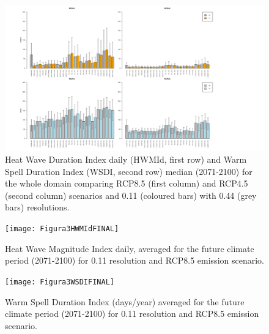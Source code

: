 \newpage
\begin{figure}
\graphicspath{ {articulo} }
\includegraphics[width=17.0cm]{Figura1conSD_conjunto}
\caption{Heat Wave Duration Index daily (HWMId, first row) and Warm Spell Duration Index (WSDI, second row) median (2071-2100) for the whole domain comparing RCP8.5 (first column) and RCP4.5 (second column) scenarios and 0.11 (coloured bars) with 0.44 (grey bars) resolutions.}
\label{fig1}       %
\end{figure}

\newpage
\begin{figure}
\texttt{[image: Figura3HWMIdFINAL]}
\caption{Heat Wave Magnitude Index daily, averaged for the future climate period (2071-2100) for 0.11 resolution and RCP8.5
emission scenario.}
\label{fighwmid}       %
\end{figure}

\newpage
\begin{figure}
\texttt{[image: Figura3WSDIFINAL]}
\caption{Warm Spell Duration Index (days/year) averaged for the future climate period (2071-2100) for 0.11 resolution and RCP8.5
emission scenario.}
\label{figwsdi}       %
\end{figure}

